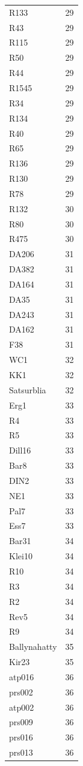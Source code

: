 \begin{longtable}[t]{ll}
R133 & 29\\
R43 & 29\\
R115 & 29\\
R50 & 29\\
R44 & 29\\
R1545 & 29\\
R34 & 29\\
R134 & 29\\
R40 & 29\\
R65 & 29\\
R136 & 29\\
R130 & 29\\
R78 & 29\\
R132 & 30\\
R80 & 30\\
R475 & 30\\
DA206 & 31\\
DA382 & 31\\
DA164 & 31\\
DA35 & 31\\
DA243 & 31\\
DA162 & 31\\
F38 & 31\\
WC1 & 32\\
KK1 & 32\\
Satsurblia & 32\\
Erg1 & 33\\
R4 & 33\\
R5 & 33\\
Dill16 & 33\\
Bar8 & 33\\
DIN2 & 33\\
NE1 & 33\\
Pal7 & 33\\
Ess7 & 33\\
Bar31 & 34\\
Klei10 & 34\\
R10 & 34\\
R3 & 34\\
R2 & 34\\
Rev5 & 34\\
R9 & 34\\
Ballynahatty & 35\\
Kir23 & 35\\
atp016 & 36\\
prs002 & 36\\
atp002 & 36\\
prs009 & 36\\
prs016 & 36\\
prs013 & 36\\

\end{longtable}
